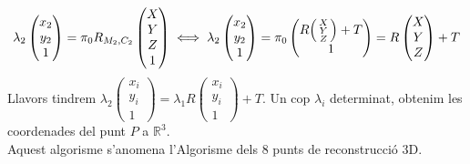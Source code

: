 \documentclass[../main.tex]{subfiles}
\begin{document}
\begin{enumerate}
\begin{displaymath}
			\lambda_2 \begin{pmatrix}x_2\\y_2\\1\end{pmatrix} = \pi_0 R_{M_2, C_2} \begin{pmatrix}X\\Y\\Z\\1\end{pmatrix} \iff \lambda_2 \begin{pmatrix}x_2\\y_2\\1\end{pmatrix} = \pi_0 \begin{pmatrix}R\begin{psmallmatrix}X\\Y\\Z\end{psmallmatrix} + T\\1\end{pmatrix} = R\begin{pmatrix}X\\Y\\Z\end{pmatrix} + T
		\end{displaymath}
		Llavors tindrem $\lambda_2 \begin{pmatrix}x_i \\ y_i \\ 1\end{pmatrix} = \lambda_1 R \begin{pmatrix}x_i\\y_i\\1\end{pmatrix} + T$. Un cop $\lambda_i$ determinat, obtenim les coordenades del punt $P$ a $\mathbb{R}^3$.\\
		Aquest algorisme s'anomena l'Algorisme dels 8 punts de reconstrucció 3D.
	\end{enumerate}
\end{document}
